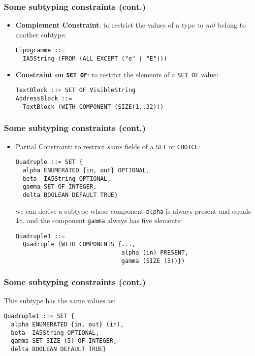 \documentclass[compress,dvips,xcolor={dvipsnames},t]{beamer}
\begin{document}
\begin{frame}[containsverbatim]
\frametitle{Some subtyping constraints (cont.)}

\begin{itemize}

  \item \textbf{Complement Constraint}: to restrict the values of a
        type to \emph{not} belong to another subtype:

\begin{verbatim}
Lipogramme ::=
  IA5String (FROM (ALL EXCEPT ("e" | "E")))
\end{verbatim}

\bigskip

  \item \textbf{Constraint on \texttt{SET OF}}: to restrict the
        elements of a \texttt{SET OF} value:

\begin{verbatim}
TextBlock ::= SET OF VisibleString
AddressBlock ::=
  TextBlock (WITH COMPONENT (SIZE(1..32)))
\end{verbatim}

\end{itemize}

\end{frame}

\begin{frame}[containsverbatim]
\frametitle{Some subtyping constraints (cont.)}

\begin{itemize}
  \item \textsf{Partial Constraint}: to restrict \emph{some} fields
        of a \texttt{SET} or \texttt{CHOICE}:

\begin{verbatim}
Quadruple ::= SET {
  alpha ENUMERATED {in, out} OPTIONAL,
  beta  IA5String OPTIONAL,
  gamma SET OF INTEGER,
  delta BOOLEAN DEFAULT TRUE}
\end{verbatim}

we can derive a subtype whose component \verb+alpha+ is always present
and equals \verb+in+, and the component \verb+gamma+ always has
five elements:
\begin{verbatim}
Quadruple1 ::=
  Quadruple (WITH COMPONENTS {..., 
                              alpha (in) PRESENT,  
                              gamma (SIZE (5))})
\end{verbatim}

\end{itemize}

\end{frame}

\begin{frame}[containsverbatim]
\frametitle{Some subtyping constraints (cont.)}

This subtype has the same values as:
\begin{verbatim}
Quadruple1 ::= SET {
  alpha ENUMERATED {in, out} (in),
  beta  IA5String OPTIONAL,
  gamma SET SIZE (5) OF INTEGER,
  delta BOOLEAN DEFAULT TRUE}
\end{verbatim}

\end{frame}
\end{document}
